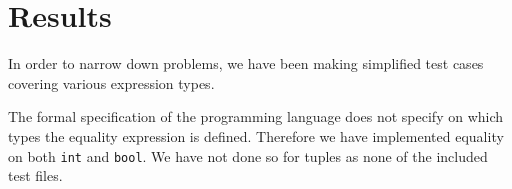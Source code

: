 \documentclass{article}
\begin{document}
\section{Results}




In order to narrow down problems, we have been making simplified test cases covering various expression types.


The formal specification of the programming language does not specify on which types the equality expression is defined. Therefore we have implemented equality on both {\tt int} and {\tt bool}. We have not done so for tuples as none of the included test files.
\end{document}
